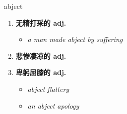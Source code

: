 
\begin{frame}
{\huge abject}
\begin{center}
\begin{enumerate}\Large
  \item \textbf{无精打采的 adj.}
  \begin{itemize}
    \item \em{\Large{a man made abject by suffering}}
  \end{itemize}
  \item \textbf{悲惨凄凉的 adj.}
  \item \textbf{卑躬屈膝的 adj.}
  \begin{itemize}
    \item \em{\Large{abject flattery}}
    \item \em{\Large{an abject apology}}
  \end{itemize}
\end{enumerate}
\end{center}
\end{frame}
